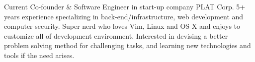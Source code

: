 

\begin{cvparagraph}

Current Co-founder \& Software Engineer in start-up company PLAT Corp. 5+ years experience specializing in back-end/infrastructure, web development and computer security. Super nerd who loves Vim, Linux and OS X and enjoys to customize all of development environment. Interested in devising a better problem solving method for challenging tasks, and learning new technologies and tools if the need arises.
\end{cvparagraph}
